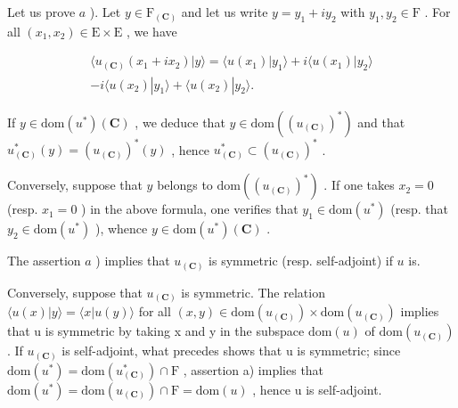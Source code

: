 Let us prove \(a\) ). Let \(y \in \mathrm{F}_{(\mathbf{C})}\) and let us write \(y = y_1 + iy_2\) with \(y_1, y_2 \in \mathrm{F}\) . For all \((x_1, x_2) \in \mathrm{E} \times \mathrm{E}\) , we have

\[
\begin{array}{c} \langle u _ {(\mathbf {C})} (x _ {1} + i x _ {2})   |   y \rangle = \langle u (x _ {1})   |   y _ {1} \rangle + i \langle u (x _ {1})   |   y _ {2} \rangle \\ - i \langle u (x _ {2})   |   y _ {1} \rangle + \langle u (x _ {2})   |   y _ {2} \rangle . \end{array}
\]

If \(y \in \text{dom}(u^*)(\mathbf{C})\) , we deduce that \(y \in \text{dom}((u_{(\mathbf{C})})^*)\) and that \(u_{(\mathbf{C})}^*(y) = (u_{(\mathbf{C})})^*(y)\) , hence \(u_{(\mathbf{C})}^* \subset (u_{(\mathbf{C})})^*\) .

Conversely, suppose that \(y\) belongs to \(\text{dom}((u_{(\mathbf{C})})^*)\) . If one takes \(x_2 = 0\) (resp. \(x_1 = 0\) ) in the above formula, one verifies that \(y_1 \in \text{dom}(u^*)\) (resp. that \(y_2 \in \text{dom}(u^*)\) ), whence \(y \in \text{dom}(u^*)(\mathbf{C})\) .

The assertion \(a\) ) implies that \(u_{(\mathbf{C})}\) is symmetric (resp. self-adjoint) if \(u\) is.

Conversely, suppose that \(u_{(\mathbf{C})}\) is symmetric. The relation \(\langle u(x)|y\rangle = \langle x|u(y)\rangle\) for all \((x,y) \in \mathrm{dom}(u_{(\mathbf{C})}) \times \mathrm{dom}(u_{(\mathbf{C})})\) implies that u is symmetric by taking x and y in the subspace \(\mathrm{dom}(u)\) of \(\mathrm{dom}(u_{(\mathbf{C})})\) . If \(u_{(\mathbf{C})}\) is self-adjoint, what precedes shows that u is symmetric; since \(\mathrm{dom}(u^{*}) = \mathrm{dom}(u_{(\mathbf{C})}^{*}) \cap \mathrm{F}\) , assertion a) implies that \(\mathrm{dom}(u^{*}) = \mathrm{dom}(u_{(\mathbf{C})}) \cap \mathrm{F} = \mathrm{dom}(u)\) , hence u is self-adjoint.


